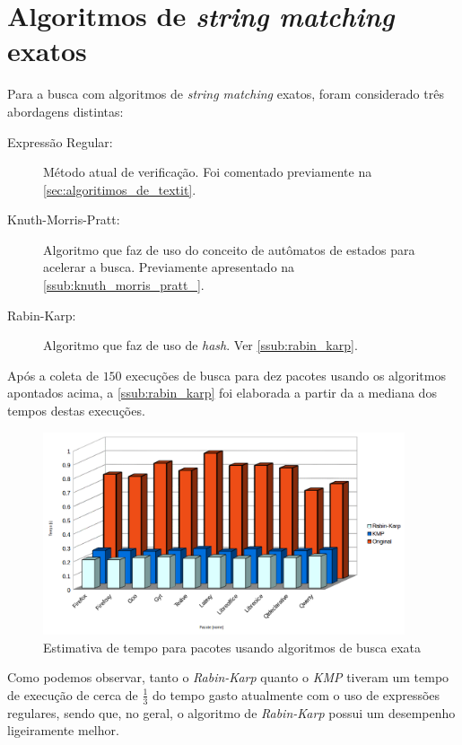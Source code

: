
\section{\nmu Algoritmos de \textit{string matching} exatos} %
\label{sec:algor_timos_de_string_matching_exatos}

Para a busca com algoritmos de \textit{string matching} exatos, foram considerado três abordagens distintas:

\begin{description}
	\item[Expressão Regular:] Método atual de verificação. Foi comentado previamente  na \autoref{sec:algoritimos_de_textit}.
	\item[Knuth-Morris-Pratt:] Algoritmo que faz de uso do conceito de autômatos de estados para acelerar a busca. Previamente apresentado na \autoref{ssub:knuth_morris_pratt_}.
	\item[Rabin-Karp:]  Algoritmo que faz de uso de \textit{hash}. Ver \autoref{ssub:rabin_karp}.
\end{description}

Após a coleta de $150$ execuções de busca para dez pacotes usando os algoritmos apontados acima, a \autoref{ssub:rabin_karp} foi elaborada a partir da a mediana dos tempos destas execuções.

\begin{figure}[htbp]
  \centering
  \includegraphics[width=0.95\textwidth]{figuras/tempo-rk_kmp_std}
  \caption{Estimativa de tempo para pacotes usando algoritmos de busca exata}
  \label{tempo_rk_kmp_std}
\end{figure}

Como podemos observar, tanto o \textit{Rabin-Karp} quanto o \textit{KMP} tiveram um tempo de execução de cerca de $\frac{1}{3}$ do tempo gasto atualmente com o uso de expressões regulares, sendo que, no geral, o algoritmo de \textit{Rabin-Karp} possui um desempenho ligeiramente melhor.


